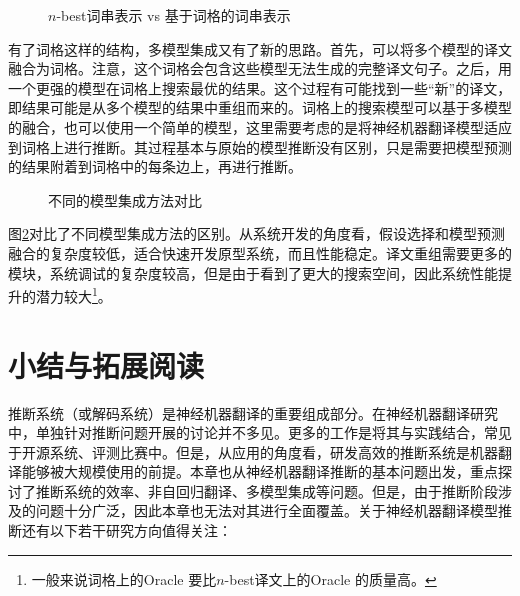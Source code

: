 \begin{figure}[htp]
\centering
 
\caption{$n$-best词串表示 vs 基于词格的词串表示}
\label{fig:14-10}
\end{figure}
\parinterval 有了词格这样的结构，多模型集成又有了新的思路。首先，可以将多个模型的译文融合为词格。注意，这个词格会包含这些模型无法生成的完整译文句子。之后，用一个更强的模型在词格上搜索最优的结果。这个过程有可能找到一些“新”的译文，即结果可能是从多个模型的结果中重组而来的。词格上的搜索模型可以基于多模型的融合，也可以使用一个简单的模型，这里需要考虑的是将神经机器翻译模型适应到词格上进行推断。其过程基本与原始的模型推断没有区别，只是需要把模型预测的结果附着到词格中的每条边上，再进行推断。

\begin{figure}[htp]
\centering
 
\caption{不同的模型集成方法对比}
\label{fig:14-11}
\end{figure}

\parinterval 图\ref{fig:14-11}对比了不同模型集成方法的区别。从系统开发的角度看，假设选择和模型预测融合的复杂度较低，适合快速开发原型系统，而且性能稳定。译文重组需要更多的模块，系统调试的复杂度较高，但是由于看到了更大的搜索空间，因此系统性能提升的潜力较大\footnote{一般来说词格上的Oracle 要比$n$-best译文上的Oracle 的质量高。}。

\sectionnewpage
\section{小结与拓展阅读}

\parinterval 推断系统（或解码系统）是神经机器翻译的重要组成部分。在神经机器翻译研究中，单独针对推断问题开展的讨论并不多见。更多的工作是将其与实践结合，常见于开源系统、评测比赛中。但是，从应用的角度看，研发高效的推断系统是机器翻译能够被大规模使用的前提。本章也从神经机器翻译推断的基本问题出发，重点探讨了推断系统的效率、非自回归翻译、多模型集成等问题。但是，由于推断阶段涉及的问题十分广泛，因此本章也无法对其进行全面覆盖。关于神经机器翻译模型推断还有以下若干研究方向值得关注：

